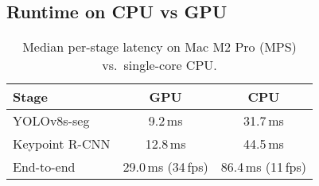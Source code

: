 \subsection{Runtime on CPU vs GPU}
\begin{table}[ht]
  \centering
  \caption{Median per-stage latency on Mac M2 Pro (MPS) vs.\ single-core CPU.}
  \label{tab:runtime_cpu_gpu}
  \begin{tabular}{lcc}
    \toprule
    \textbf{Stage} & \textbf{GPU} & \textbf{CPU} \\
    \midrule
    YOLOv8s-seg    & 9.2\,ms  & 31.7\,ms  \\
    Keypoint R-CNN & 12.8\,ms & 44.5\,ms  \\
    End-to-end     & 29.0\,ms (34\,fps) & 86.4\,ms (11\,fps) \\
    \bottomrule
  \end{tabular}
\end{table}